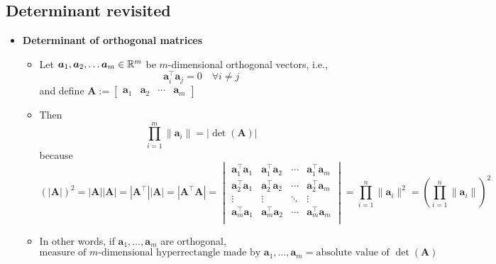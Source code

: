 \documentclass[12pt,a4paper]{article}
\begin{document}
\subsection{Determinant revisited}

\begin{itemize}

\item \textbf{Determinant of orthogonal matrices}
  \begin{itemize}
  \item Let $\bm{a}_{1}, \bm{a}_{2},\ldots \bm{a}_{m} \in \mathbb{R}^{m}$ be $m$-dimensional orthogonal vectors,
    i.e.,
    \begin{equation}\nonumber%
      \bm{a}_{i}^{\top}\bm{a}_{j} = 0 \quad \forall i\neq j
    \end{equation}
    and define $\bm{A}:= \begin{bmatrix} \bm{a}_{1} & \bm{a}_{2} & \cdots & \bm{a}_{m}\end{bmatrix}$
  \item Then
    \begin{equation}\nonumber%
      \prod_{i=1}^{m}\|\bm{a}_{i}\| = \left|\det(\bm{A}) \right|
    \end{equation}
    because
    \begin{equation}\nonumber%
      (|\bm{A}|)^{2}
      = 
      |\bm{A}||\bm{A}|
      =
      |\bm{A}^{\top}||\bm{A}|
      =
      |\bm{A}^{\top}\bm{A}|
      = \begin{vmatrix}
          \bm{a}_{1}^{\top}\bm{a}_{1} & \bm{a}_{1}^{\top}\bm{a}_{2} & \cdots & \bm{a}_{1}^{\top}\bm{a}_{m} \\
          \bm{a}_{2}^{\top}\bm{a}_{1} & \bm{a}_{2}^{\top}\bm{a}_{2} & \cdots & \bm{a}_{2}^{\top}\bm{a}_{m} \\
          \vdots & \vdots & \ddots & \vdots \\
          \bm{a}_{m}^{\top}\bm{a}_{1} & \bm{a}_{m}^{\top}\bm{a}_{2} & \cdots & \bm{a}_{m}^{\top}\bm{a}_{m} \\
      \end{vmatrix}
      = \prod_{i=1}^{n}\|\bm{a}_{i}\|^{2}
      = \left(\prod_{i=1}^{n}\|\bm{a}_{i}\|\right)^{2}
    \end{equation}
  \item In other words,
    if $\bm{a}_{1},\ldots,\bm{a}_{m}$ are orthogonal,
    \begin{equation}\nonumber%
      \text{measure of $m$-dimensional hyperrectangle made by $\bm{a}_{1},\ldots,\bm{a}_{m}$}
      = \text{absolute value of $\det(\bm{A})$}
    \end{equation}
  \end{itemize}


\end{itemize}
\end{document}

